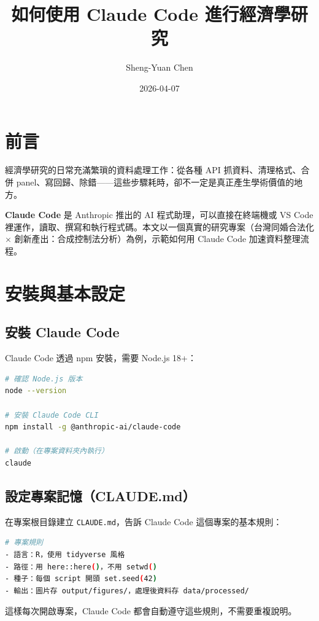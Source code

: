 \documentclass[12pt, a4paper]{article}
\title{如何使用 Claude Code 進行經濟學研究}
\author{Sheng-Yuan Chen}
\date{2026-04-07}
\begin{document}
\maketitle

\section*{前言}

經濟學研究的日常充滿繁瑣的資料處理工作：從各種 API 抓資料、清理格式、合併 panel、寫回歸、除錯——這些步驟耗時，卻不一定是真正產生學術價值的地方。

\textbf{Claude Code} 是 Anthropic 推出的 AI 程式助理，可以直接在終端機或 VS Code 裡運作，讀取、撰寫和執行程式碼。本文以一個真實的研究專案（台灣同婚合法化 $\times$ 創新產出：合成控制法分析）為例，示範如何用 Claude Code 加速資料整理流程。

\section{安裝與基本設定}

\subsection{安裝 Claude Code}

Claude Code 透過 npm 安裝，需要 Node.js 18+：

\begin{lstlisting}[language=bash]
# 確認 Node.js 版本
node --version

# 安裝 Claude Code CLI
npm install -g @anthropic-ai/claude-code

# 啟動（在專案資料夾內執行）
claude
\end{lstlisting}

\subsection{設定專案記憶（CLAUDE.md）}

在專案根目錄建立 \texttt{CLAUDE.md}，告訴 Claude Code 這個專案的基本規則：

\begin{lstlisting}[language=bash]
# 專案規則
- 語言：R，使用 tidyverse 風格
- 路徑：用 here::here()，不用 setwd()
- 種子：每個 script 開頭 set.seed(42)
- 輸出：圖片存 output/figures/，處理後資料存 data/processed/
\end{lstlisting}

這樣每次開啟專案，Claude Code 都會自動遵守這些規則，不需要重複說明。
\end{document}
